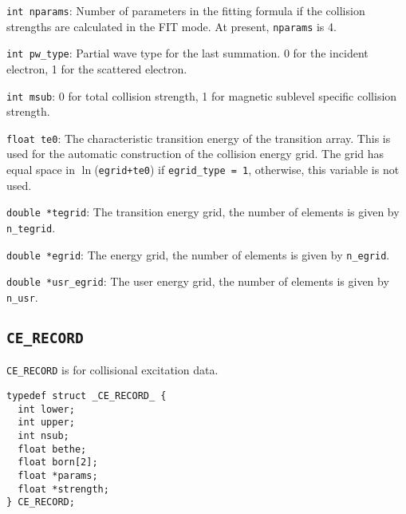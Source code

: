 \begin{dbdesc}
\item[\texttt{int nparams}:] Number of parameters in the fitting formula if the
collision strengths are calculated in the FIT mode. At present,
\texttt{nparams} is 4. 
\item[\texttt{int pw\_type}:] Partial wave type for the last summation. 0 for
the incident electron, 1 for the scattered electron.
\item[\texttt{int msub}:] 0 for total collision strength, 1 for magnetic
sublevel specific collision strength.
\item[\texttt{float te0}:] The characteristic transition energy of the 
transition array. This is used for the automatic construction of the 
collision energy grid. The grid has equal space in $\ln$(\texttt{egrid+te0})
if \texttt{egrid\_type = 1}, otherwise, this variable is not used.
\item[\texttt{double *tegrid}:] The transition energy grid, the number of
elements is given by \texttt{n\_tegrid}.
\item[\texttt{double *egrid}:] The energy grid, the number of elements is
given by \texttt{n\_egrid}.
\item[\texttt{double *usr\_egrid}:] The user energy grid, the number of
elements is given by \texttt{n\_usr}.
\end{dbdesc}

\subsection{\texttt{CE\_RECORD}}
\texttt{CE\_RECORD} is for collisional excitation data.

\begin{verbatim}
typedef struct _CE_RECORD_ {
  int lower;
  int upper;
  int nsub;
  float bethe;
  float born[2];
  float *params;
  float *strength;
} CE_RECORD;
\end{verbatim}

